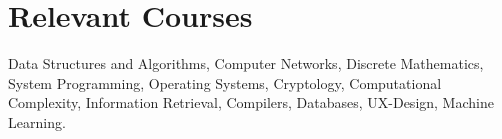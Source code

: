 \documentclass[letterpaper,11pt]{article}
\begin{document}

\section{Relevant Courses}
Data Structures and Algorithms, Computer Networks, Discrete Mathematics, System Programming, Operating Systems, Cryptology, Computational Complexity, Information Retrieval, Compilers, Databases, UX-Design, Machine Learning.
\end{document}
